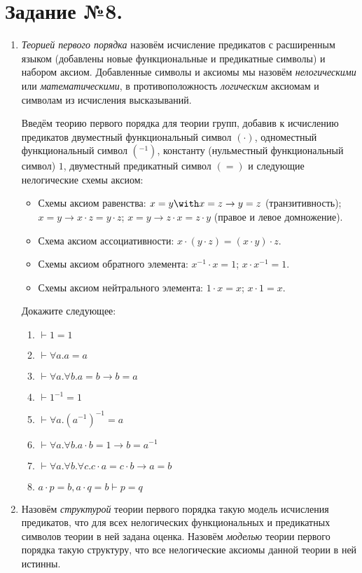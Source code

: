 \documentclass[10pt,a4paper,oneside]{article}
\begin{document}
\section*{Задание №8.}
\begin{enumerate}
\item \emph{Теорией первого порядка} назовём исчисление предикатов с расширенным языком (добавлены новые функциональные и
предикатные символы) и набором аксиом.
Добавленные символы и аксиомы мы назовём \emph{нелогическими} или \emph{математическими}, в противоположность \emph{логическим}
аксиомам и символам из исчисления высказываний.

Введём теорию первого порядка для теории групп, добавив к исчислению предикатов двуместный функциональный символ $(\cdot)$, 
одноместный функциональный символ $({}^{-1})$, константу (нульместный функциональный символ) $1$, 
двуместный предикатный символ $(=)$ и следующие нелогические схемы аксиом: 
\begin{itemize}
\item Схемы аксиом равенства: $x = y \with x = z \rightarrow y = z$ (транзитивность); $x = y \rightarrow x\cdot z = y\cdot z$;
$x = y \rightarrow z \cdot x = z \cdot y$ (правое и левое домножение).
\item Схема аксиом ассоциативности: $x \cdot (y \cdot z) = (x \cdot y) \cdot z$.
\item Схемы аксиом обратного элемента: $x^{-1} \cdot x = 1$; $x \cdot x^{-1} = 1$.
\item Схемы аксиом нейтрального элемента: $1 \cdot x = x$; $x \cdot 1 = x$.
\end{itemize}

Докажите следующее:
\begin{enumerate}
\item $\vdash 1 = 1$
\item $\vdash \forall a.a = a$
\item $\vdash \forall a.\forall b.a = b \rightarrow b = a$
\item $\vdash 1 ^ {-1} = 1$
\item $\vdash \forall a.(a^{-1})^{-1} = a$
\item $\vdash \forall a. \forall b. a \cdot b = 1 \rightarrow b = a^{-1}$
\item $\vdash \forall a.\forall b.\forall c. c \cdot a = c \cdot b \rightarrow a = b$
\item $a \cdot p = b, a \cdot q = b \vdash p = q$
\end{enumerate}

\item Назовём \emph{структурой} теории первого порядка такую модель исчисления предикатов, что для всех нелогических
функциональных и предикатных символов теории в ней задана оценка.
Назовём \emph{моделью} теории первого порядка такую структуру, что все нелогические аксиомы данной теории в ней 
истинны.


\end{enumerate}
\end{document}
